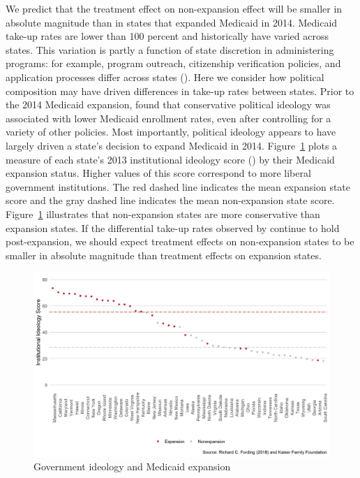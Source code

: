 \documentclass[aoas]{imsart}
\theoremstyle{plain}
\theoremstyle{remark}
\begin{document}
We predict that the treatment effect on non-expansion effect will be smaller in absolute magnitude than in states that expanded Medicaid in 2014. Medicaid take-up rates are lower than 100 percent and historically have varied across states. This variation is partly a function of state discretion in administering programs: for example, program outreach, citizenship verification policies, and application processes differ across states (\cite{courtemanche2017early}). Here we consider how political composition may have driven differences in take-up rates between states. Prior to the 2014 Medicaid expansion, \cite{sommers2012understanding} found that conservative political ideology was associated with lower Medicaid enrollment rates, even after controlling for a variety of other policies. Most importantly, political ideology appears to have largely driven a state's decision to expand Medicaid in 2014. Figure~\ref{fig:stateideology} plots a measure of each state's 2013 institutional ideology score (\cite{berry1998measuring}) by their Medicaid expansion status. Higher values of this score correspond to more liberal government institutions. The red dashed line indicates the mean expansion state score and the gray dashed line indicates the mean non-expansion state score. Figure~\ref{fig:stateideology} illustrates that non-expansion states are more conservative than expansion states. If the differential take-up rates observed by \cite{sommers2012understanding} continue to hold post-expansion, we should expect treatment effects on non-expansion states to be smaller in absolute magnitude than treatment effects on expansion states. 

\begin{figure}
    \begin{center}
    \caption{Government ideology and Medicaid expansion}
    \label{fig:stateideology}
    \includegraphics[scale=0.6]{01_Plots/political-expansion-plot.png}
    \end{center}
\end{figure}
\end{document}
